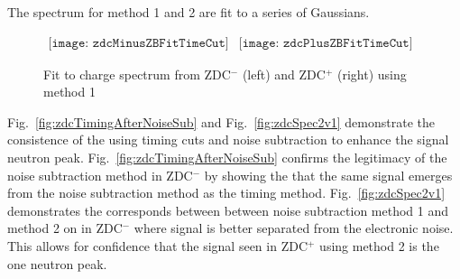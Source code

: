       The spectrum for method 1 and 2 are fit to a series of Gaussians.
      \begin{figure}[!Hhtb]
        \centering
        $ \begin{array}{cc}
          \texttt{[image: zdcMinusZBFitTimeCut]} &
          \texttt{[image: zdcPlusZBFitTimeCut]}
        \end{array} $
        \caption{Fit to charge spectrum from ZDC$^{-}$ (left) and ZDC$^{+}$ (right) using 
          method 1}
        \label{fig:zdcM1Fit}
      \end{figure}

       Fig.~\ref{fig:zdcTimingAfterNoiseSub} and Fig.~\ref{fig:zdcSpec2v1} 
        demonstrate the consistence of the using timing cuts and noise 
        subtraction to enhance the signal neutron peak. 
      Fig.~\ref{fig:zdcTimingAfterNoiseSub} confirms the legitimacy of the 
        noise subtraction method in ZDC$^{-}$ by showing the that the same signal
        emerges from the noise subtraction method as the timing method.
      Fig.~\ref{fig:zdcSpec2v1} demonstrates the corresponds between between
        noise subtraction method 1 and method 2 on in ZDC$^{-}$ where signal is 
        better separated from the electronic noise. 
      This allows for confidence that the signal seen in ZDC$^{+}$ using method 2 
        is the one neutron peak.
 
